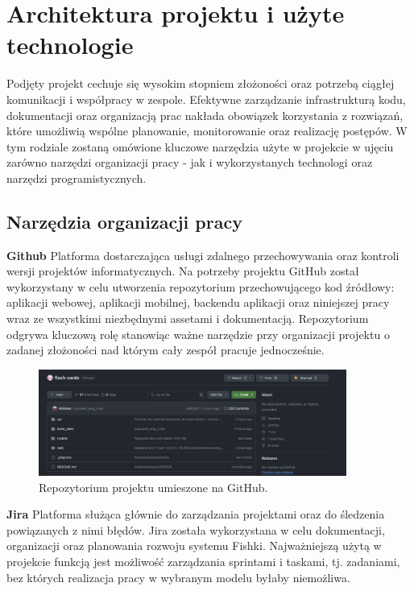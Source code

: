 \chapter{Architektura projektu i użyte technologie}
Podjęty projekt cechuje się wysokim stopniem złożoności oraz potrzebą ciągłej komunikacji i współpracy w zespole. Efektywne zarządzanie infrastrukturą kodu, dokumentacji oraz organizacją prac nakłada obowiązek korzystania z rozwiązań, które umożliwią wspólne planowanie, monitorowanie oraz realizację postępów. W tym rodziale zostaną omówione kluczowe narzędzia użyte w projekcie w ujęciu zarówno narzędzi organizacji pracy - jak i wykorzystanych technologi oraz narzędzi programistycznych.

\section{Narzędzia organizacji pracy}

\textbf{Github} Platforma dostarczająca usługi zdalnego przechowywania oraz kontroli wersji projektów informatycznych. Na potrzeby projektu GitHub został wykorzystany w celu utworzenia repozytorium przechowującego kod źródłowy: aplikacji webowej, aplikacji mobilnej, backendu aplikacji oraz niniejszej pracy wraz ze wszystkimi niezbędnymi assetami i dokumentacją. Repozytorium odgrywa kluczową rolę stanowiąc ważne narzędzie przy organizacji projektu o zadanej złożoności nad którym cały zespół pracuje jednocześnie.

\begin{figure}[H]
    \centering
    \includegraphics[width=0.9\textwidth]{chapters/chapter_7/github.png}
    \caption{Repozytorium projektu umieszone na GitHub.}
    \label{img:github}
\end{figure}


\textbf{Jira} Platforma służąca głównie do zarządzania projektami oraz do śledzenia powiązanych z nimi błędów. Jira została wykorzystana w celu dokumentacji, organizacji oraz planowania rozwoju systemu Fishki. Najważniejszą użytą w projekcie funkcją jest możliwość zarządzania sprintami i taskami, tj. zadaniami, bez których realizacja pracy w wybranym modelu byłaby niemożliwa.

